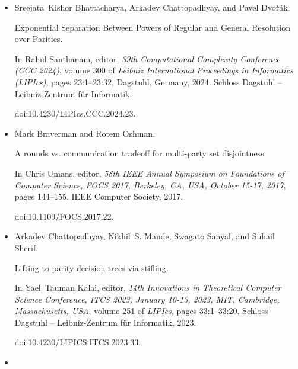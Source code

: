 \begin{itemize}
Supercritical space-width trade-offs for resolution.


\emph{SIAM J. Comput.}, 49(1):98–118, 2020.


doi:10.1137/16M1109072.





\item[] 
[9]

Sreejata Kishor Bhattacharya, Arkadev Chattopadhyay, and Pavel Dvořák.


Exponential Separation Between Powers of Regular and General
Resolution over Parities.


In Rahul Santhanam, editor, \emph{39th Computational Complexity
Conference (CCC 2024)}, volume 300 of \emph{Leibniz International Proceedings
in Informatics (LIPIcs)}, pages 23:1–23:32, Dagstuhl, Germany, 2024. Schloss
Dagstuhl – Leibniz-Zentrum für Informatik.


doi:10.4230/LIPIcs.CCC.2024.23.





\item[] 
[10]

Mark Braverman and Rotem Oshman.


A rounds vs. communication tradeoff for multi-party set disjointness.


In Chris Umans, editor, \emph{58th IEEE Annual Symposium on
Foundations of Computer Science, FOCS 2017, Berkeley, CA, USA, October
15-17, 2017}, pages 144–155. IEEE Computer Society, 2017.


doi:10.1109/FOCS.2017.22.





\item[] 
[11]

Arkadev Chattopadhyay, Nikhil S. Mande, Swagato Sanyal, and Suhail Sherif.


Lifting to parity decision trees via stifling.


In Yael Tauman Kalai, editor, \emph{14th Innovations in Theoretical
Computer Science Conference, ITCS 2023, January 10-13, 2023, MIT,
Cambridge, Massachusetts, USA}, volume 251 of \emph{LIPIcs}, pages
33:1–33:20. Schloss Dagstuhl – Leibniz-Zentrum für Informatik, 2023.


doi:10.4230/LIPICS.ITCS.2023.33.





\item[] 
[12]


\end{itemize}
